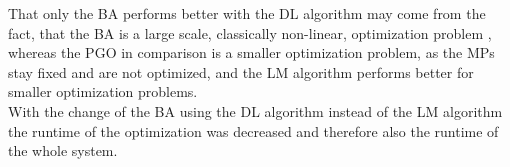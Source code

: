 That only the \ac{BA} performs better with the \ac{DL} algorithm may come from the fact, that the \ac{BA} is a large scale, classically non-linear, optimization problem \cite{Lourakis2005, Triggs2000}, whereas the \ac{PGO} in comparison is a smaller optimization problem, as the \acp{MP} stay fixed and are not optimized, and the \ac{LM} algorithm performs better for smaller optimization problems.\\

With the change of the \ac{BA} using the \ac{DL} algorithm instead of the \ac{LM} algorithm the runtime of the optimization was decreased and therefore also the runtime of the whole system.\\

